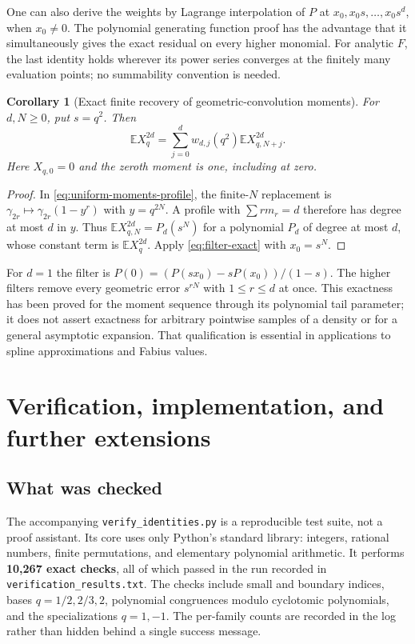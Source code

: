 \documentclass[11pt,a4paper]{article}
\numberwithin{equation}{section}
\newtheorem{corollary}[theorem]{Corollary}
\theoremstyle{definition}
\theoremstyle{remark}
\begin{document}
One can also derive the weights by Lagrange interpolation of $P$ at
$x_0,x_0s,\ldots,x_0s^d$, when $x_0\ne0$. The polynomial generating
function proof has the advantage that it simultaneously gives the
exact residual on every higher monomial. For analytic $F$, the last
identity holds wherever its power series converges at the finitely
many evaluation points; no summability convention is needed.

\begin{corollary}[Exact finite recovery of geometric-convolution moments]
For $d,N\ge0$, put $s=q^2$. Then
\begin{equation}
 \boxed{\displaystyle
 \mathbb E X_q^{2d}
       =\sum_{j=0}^d w_{d,j}(q^2)
                   \mathbb E X_{q,N+j}^{2d}.}
 \label{eq:moment-extrapolation}
\end{equation}
Here $X_{q,0}=0$ and the zeroth moment is one, including at zero.
\end{corollary}
\begin{proof}
In \cref{eq:uniform-moments-profile}, the finite-$N$ replacement is
$\gamma_{2r}\mapsto\gamma_{2r}(1-y^r)$ with $y=q^{2N}$.
A profile with $\sum rm_r=d$ therefore has degree at most $d$ in $y$.
Thus $\mathbb E X_{q,N}^{2d}=P_d(s^N)$ for a polynomial $P_d$ of
degree at most $d$, whose constant term is $\mathbb E X_q^{2d}$.
Apply \cref{eq:filter-exact} with $x_0=s^N$.
\end{proof}
For $d=1$ the filter is
$P(0)=(P(sx_0)-sP(x_0))/(1-s)$. The higher filters remove every
geometric error $s^{rN}$ with $1\le r\le d$ at once. This exactness
has been proved for the moment sequence through its polynomial tail
parameter; it does not assert exactness for arbitrary pointwise
samples of a density or for a general asymptotic expansion. That
qualification is essential in applications to spline approximations
and Fabius values.

\section{Verification, implementation, and further extensions}
\label{sec:verification}

\subsection{What was checked}
The accompanying \texttt{verify\_identities.py} is a reproducible test
suite, not a proof assistant. Its core uses only Python's standard
library: integers, rational numbers, finite permutations, and elementary
polynomial arithmetic. It performs \textbf{10,267 exact checks}, all of
which passed in the run recorded in \texttt{verification\_results.txt}.
The checks include small and boundary indices, bases $q=1/2,2/3,2$,
polynomial congruences modulo cyclotomic polynomials, and the
specializations $q=1,-1$. The per-family counts are recorded in the
log rather than hidden behind a single success message.
\end{document}
